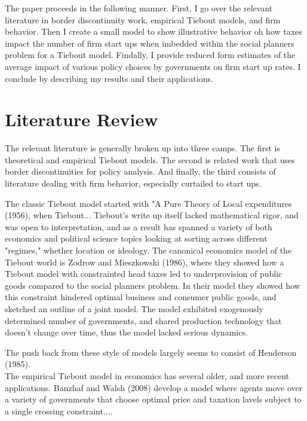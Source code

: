 \documentclass[11pt,a4paper]{article}\usepackage[]{graphicx}\usepackage[]{color}
\begin{document}
The paper proceeds in the following manner. First, I go over the relevant literature in border discontinuity work, empirical Tiebout models, and firm behavior. Then I create a small model to show illustrative behavior oh how taxes impact the number of firm start ups when imbedded within the social planners problem for a Tiebout model. Findally, I provide reduced form estimates of the average impact of various policy choices by governments on firm start up rates. I conclude by describing my results and their applications.

\section{Literature Review}


The relevant literature is generally broken up into three camps. The first is theoretical and empirical Tiebout models. The second is related work that uses border discontinuities for policy analysis. And finally, the third consists of literature dealing with firm behavior, especially curtailed to start ups.

The classic Tiebout model started with "A Pure Theory of Local expenditures (1956), when Tiebout... Tiebout's write up itself lacked mathematical rigor, and was open to interpretation, and as a result has spanned a variety of both economics and political science topics looking at sorting across different "regimes," whether location or ideology. The canonical economics model of the Tiebout world is Zodrow and Mieszkowski (1986), where they showed how a Tiebout model with constrainted head taxes led to underprovision of public goods compared to the social planners problem. In their model they showed how this constraint hindered optimal business and consumer public goods, and sketched an outline of a joint model. The model exhibited exogenously determined number of governments, and shared production technology that doesn't change over time, thus the model lacked serious dynamics.

The push back from these style of models largely seems to consist of Henderson (1985).\\

The empirical Tiebout model in economics has several older, and more recent applications. Banzhaf and Walsh (2008) develop a model where agents move over a variety of governments that choose optimal price and taxation lavels subject to a single crossing constraint....\\
\end{document}
